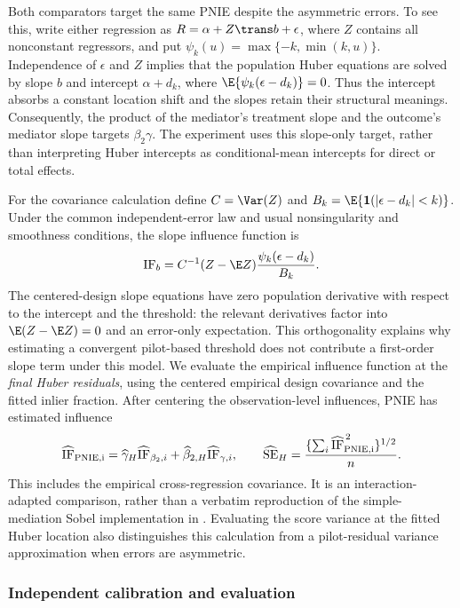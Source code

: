 Both comparators target the same PNIE despite the asymmetric errors. To see this, write either regression as $R=\alpha+Z\trans b+\epsilon$, where $Z$ contains all nonconstant regressors, and put $\psi_k(u)=\max\{-k,\min(k,u)\}$. Independence of $\epsilon$ and $Z$ implies that the population Huber equations are solved by slope $b$ and intercept $\alpha+d_k$, where $\E\{\psi_k(\epsilon-d_k)\}=0$. Thus the intercept absorbs a constant location shift and the slopes retain their structural meanings. Consequently, the product of the mediator's treatment slope and the outcome's mediator slope targets $\beta_2\gamma$. The experiment uses this slope-only target, rather than interpreting Huber intercepts as conditional-mean intercepts for direct or total effects.

For the covariance calculation define $C=\Var(Z)$ and $B_k=\E\{\mathbf1(|\epsilon-d_k|<k)\}$. Under the common independent-error law and usual nonsingularity and smoothness conditions, the slope influence function is
\[
\operatorname{IF}_b
=C^{-1}(Z-\E Z)\frac{\psi_k(\epsilon-d_k)}{B_k}.
\]
The centered-design slope equations have zero population derivative with respect to the intercept and the threshold: the relevant derivatives factor into $\E(Z-\E Z)=0$ and an error-only expectation. This orthogonality explains why estimating a convergent pilot-based threshold does not contribute a first-order slope term under this model. We evaluate the empirical influence function at the \emph{final Huber residuals}, using the centered empirical design covariance and the fitted inlier fraction. After centering the observation-level influences, PNIE has estimated influence
\[
\widehat{\operatorname{IF}}_{\rm PNIE,i}
=\widehat\gamma_H\widehat{\operatorname{IF}}_{\beta_2,i}
+\widehat\beta_{2,H}\widehat{\operatorname{IF}}_{\gamma,i},
\qquad
\widehat{\operatorname{SE}}_H
=\frac{\{\sum_i\widehat{\operatorname{IF}}_{\rm PNIE,i}^{\,2}\}^{1/2}}{n}.
\]
This includes the empirical cross-regression covariance. It is an interaction-adapted comparison, rather than a verbatim reproduction of the simple-mediation Sobel implementation in \citet{wang2025}. Evaluating the score variance at the fitted Huber location also distinguishes this calculation from a pilot-residual variance approximation when errors are asymmetric.

\subsubsection*{Independent calibration and evaluation}

